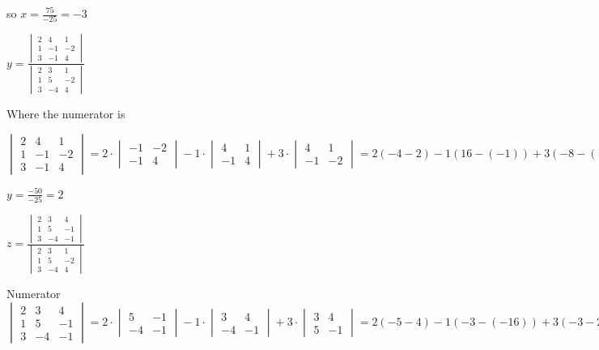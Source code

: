 \documentclass[]{report}
\begin{document}
so $x = \frac{75}{-25} = -3$


$y = \frac{
	\begin{vmatrix}
	2 & 4 & 1\\
	1 & -1 & -2 \\
	3 & -1 & 4
	\end{vmatrix}
}{
	\begin{vmatrix}
	2 & 3 & 1\\
	1 &  5 & -2 \\
	3 & -4 & 4
	\end{vmatrix}
}$

Where the numerator is 

$	\begin{vmatrix}
2 & 4 & 1\\
1 & -1 & -2 \\
3 & -1 & 4
\end{vmatrix} = 2 \cdot \begin{vmatrix}
-1 & -2 \\
-1 & 4
\end{vmatrix}
- 1 \cdot \begin{vmatrix}
4 & 1\\
-1 & 4
\end{vmatrix}
+ 3 \cdot \begin{vmatrix}
4 & 1 \\
-1 & -2
\end{vmatrix}
= 2(-4 -2) - 1(16 - (-1)) + 3(-8 - (-1)) = 2(-6) - 1(17) + 3(-7) = -12 - 17 - 21 = -50 
$

$ y = \frac{-50}{-25} = 2$


$z = \frac{
	\begin{vmatrix}
	2 & 3 & 4\\
	1 & 5 & -1 \\
	3 & -4 & -1
	\end{vmatrix}
}{
	\begin{vmatrix}
	2 & 3 & 1\\
	1 &  5 & -2 \\
	3 & -4 & 4
	\end{vmatrix}
}$

Numerator
$	\begin{vmatrix}
2 & 3 & 4\\
1 & 5 & -1 \\
3 & -4 & -1
\end{vmatrix} = 2 \cdot \begin{vmatrix}
5 & -1 \\
-4 & -1
\end{vmatrix}
-1 \cdot \begin{vmatrix}
3 & 4 \\
-4 & -1
\end{vmatrix}
+ 3 \cdot \begin{vmatrix}
3 & 4 \\
5 & -1
\end{vmatrix}
= 2 (-5 - 4) - 1(-3 - (-16)) + 3(-3 - 20) = 2(-9) - (13) + 3(-23) = -18 - 13 - 69 = -100
$
\end{document}

